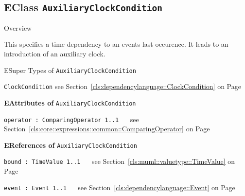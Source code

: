 	

\subsection{EClass \bfseries \texttt{AuxiliaryClockCondition}\normalfont}
\label{cls:dependencylanguage::AuxiliaryClockCondition} 
	
	\begin{longdescription}
		\item[Overview] 		
				

	

		This specifies a time dependency to an events last occurence.
It leads to an introduction of an auxiliary clock.		
		\item[ESuper Types of \texttt{AuxiliaryClockCondition}] ~
			\begin{longdescription}
				\item[\texttt{ClockCondition}] see Section~\ref{cls:dependencylanguage::ClockCondition} on Page~\pageref{cls:dependencylanguage::ClockCondition}						\end{longdescription}
		
	
			\item[\textbf{EAttributes of} \texttt{AuxiliaryClockCondition}] ~
			\begin{longdescription}
	\item[\texttt{operator : ComparingOperator \symbol{"5B}1..1\symbol{"5D}
}] ~
	see Section~\ref{cls:core::expressions::common::ComparingOperator} on Page~\pageref{cls:core::expressions::common::ComparingOperator}
	
	\nopagebreak
		
				

	

	
			\end{longdescription}
			\item[\textbf{EReferences of} \texttt{AuxiliaryClockCondition}] ~
			\begin{longdescription}
	\item[\texttt{bound : TimeValue \symbol{"5B}1..1\symbol{"5D}
}] ~
	see Section~\ref{cls:muml::valuetype::TimeValue} on Page~\pageref{cls:muml::valuetype::TimeValue}
	
	\nopagebreak
		
				

	

	
	\item[\texttt{event : Event \symbol{"5B}1..1\symbol{"5D}
}] ~
	see Section~\ref{cls:dependencylanguage::Event} on Page~\pageref{cls:dependencylanguage::Event}
	
	\nopagebreak
		
				

	

	
			\end{longdescription}
	
	\end{longdescription}
	

